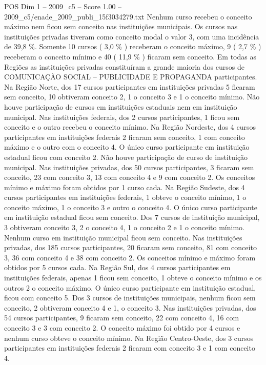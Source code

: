 \begin{textsample}{POS Dim 1 – 2009\_c5 – Score 1.00 – 2009\_c5/enade\_2009\_publi\_15f3034279.txt}
Nenhum curso recebeu o conceito máximo nem ficou sem conceito nas instituições municipais.
Os cursos nas instituições privadas tiveram como conceito modal o valor 3, com uma incidência de 39,8 \%.
Somente 10 cursos ( 3,0 \% ) receberam o conceito máximo, 9 ( 2,7 \% ) receberam o conceito mínimo e 40 ( 11,9 \% ) ficaram sem conceito.
Em todas as Regiões as instituições privadas constituíram a grande maioria dos cursos de COMUNICAÇÃO SOCIAL – PUBLICIDADE E PROPAGANDA participantes.
Na Região Norte, dos 17 cursos participantes em instituições privadas 5 ficaram sem conceito, 10 obtiveram conceito 2, 1 o conceito 3 e 1 o conceito mínimo.
Não houve participação de cursos em instituições estaduais nem em instituição municipal.
Nas instituições federais, dos 2 cursos participantes, 1 ficou sem conceito e o outro recebeu o conceito mínimo.
Na Região Nordeste, dos 4 cursos participantes em instituições federais 2 ficaram sem conceito, 1 com conceito máximo e o outro com o conceito 4.
O único curso participante em instituição estadual ficou com conceito 2.
Não houve participação de curso de instituição municipal.
Nas instituições privadas, dos 50 cursos participantes, 3 ficaram sem conceito, 23 com conceito 3, 13 com conceito 4 e 9 com conceito 2.
Os conceitos mínimo e máximo foram obtidos por 1 curso cada.
Na Região Sudeste, dos 4 cursos participantes em instituições federais, 1 obteve o conceito mínimo, 1 o conceito máximo, 1 o conceito 3 e outro o conceito 4.
O único curso participante em instituição estadual ficou sem conceito.
Dos 7 cursos de instituição municipal, 3 obtiveram conceito 3, 2 o conceito 4, 1 o conceito 2 e 1 o conceito mínimo.
Nenhum curso em instituição municipal ficou sem conceito.
Nas instituições privadas, dos 185 cursos participantes, 20 ficaram sem conceito, 81 com conceito 3, 36 com conceito 4 e 38 com conceito 2.
Os conceitos mínimo e máximo foram obtidos por 5 cursos cada.
Na Região Sul, dos 4 cursos participantes em instituições federais, apenas 1 ficou sem conceito, 1 obteve o conceito mínimo e os outros 2 o conceito máximo.
O único curso participante em instituição estadual, ficou com conceito 5.
Dos 3 cursos de instituições municipais, nenhum ficou sem conceito, 2 obtiveram conceito 4 e 1, o conceito 3.
Nas instituições privadas, dos 54 cursos participantes, 9 ficaram sem conceito, 22 com conceito 4, 16 com conceito 3 e 3 com conceito 2.
O conceito máximo foi obtido por 4 cursos e nenhum curso obteve o conceito mínimo.
Na Região Centro-Oeste, dos 3 cursos participantes em instituições federais 2 ficaram com conceito 3 e 1 com conceito 4.

\end{textsample}
